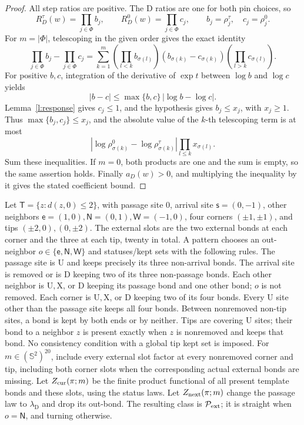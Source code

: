 \begin{proof}
All step ratios are positive. The \(\mathrm D\) ratios are one
for both pin choices, so
\[
 R_D^\tau(w)=\prod_{j\in\Phi}b_j,\qquad
 R_D^0(w)=\prod_{j\in\Phi}c_j,\qquad
 b_j=\rho_j^\tau,\quad c_j=\rho_j^0.
\]
For \(m=|\Phi|\), telescoping in the given order gives the exact
identity
\[
 \prod_{j\in\Phi}b_j-\prod_{j\in\Phi}c_j
 =\sum_{k=1}^m
   \left(\prod_{l<k}b_{\sigma(l)}\right)
   (b_{\sigma(k)}-c_{\sigma(k)})
   \left(\prod_{l>k}c_{\sigma(l)}\right).
\]
For positive \(b,c\), integration of the derivative of
\(\exp t\) between \(\log b\) and \(\log c\) yields
\[
 |b-c|\le\max\{b,c\}\,|\log b-\log c|.
\]
Lemma~\ref{l:response} gives \(c_j\le1\), and the hypothesis
gives \(b_j\le x_j\), with \(x_j\ge1\).
Thus \(\max\{b_j,c_j\}\le x_j\), and the absolute value of
the \(k\)-th telescoping term is at most
\[
 |\log\rho_{\sigma(k)}^0-\log\rho_{\sigma(k)}^\tau|
          \prod_{l\le k}x_{\sigma(l)}.
\]
Sum these inequalities. If \(m=0\), both products are one and
the sum is empty, so the same assertion holds.
Finally \(a_D(w)>0\), and multiplying the inequality by it
gives the stated coefficient bound.
\end{proof}

\begin{definition}\label{d:pattern}
Let \(\mathsf T=\{z:d(z,0)\le2\}\), with passage site \(0\),
arrival site \(\mathsf s=(0,-1)\), other neighbors
\(\mathsf e=(1,0),\mathsf N=(0,1),\mathsf W=(-1,0)\),
four corners \((\pm1,\pm1)\), and tips \((\pm2,0),(0,\pm2)\).
The external slots are the two external bonds at each corner and
the three at each tip, twenty in total.
A pattern chooses an out-neighbor \(o\in\{\mathsf e,\mathsf N,\mathsf W\}\)
and statuses/kept sets with the following rules.
The passage site is \(\mathrm U\) and keeps precisely its three
non-arrival bonds. The arrival site is removed or is \(\mathrm D\)
keeping two of its three non-passage bonds.
Each other neighbor is \(\mathrm U,\mathrm X\), or \(\mathrm D\)
keeping its passage bond and one other bond; \(o\) is not removed.
Each corner is \(\mathrm U,\mathrm X\), or \(\mathrm D\) keeping
two of its four bonds. Every \(\mathrm U\) site other than the
passage site keeps all four bonds.
Between nonremoved non-tip sites, a bond is kept by both ends or
by neither. Tips are covering \(\mathrm U\) sites; their bond to
a neighbor \(z\) is present exactly when \(z\) is nonremoved and
keeps that bond. No consistency condition with a global tip kept
set is imposed.
For \(m\in(\mathbb S^2)^{20}\), include every external slot factor
at every nonremoved corner and tip, including both corner slots
when the corresponding actual external bonds are missing.
Let \(Z_{\rm cur}(\pi;m)\) be the finite product functional of
all present template bonds and these slots, using the status laws.
Let \(Z_{\rm next}(\pi;m)\) change the passage law to
\(\lambda_{\mathrm D}\) and drop its out-bond.
The resulting class is \(\mathcal P_{\rm ext}\); it is straight
when \(o=\mathsf N\), and turning otherwise.
\end{definition}

